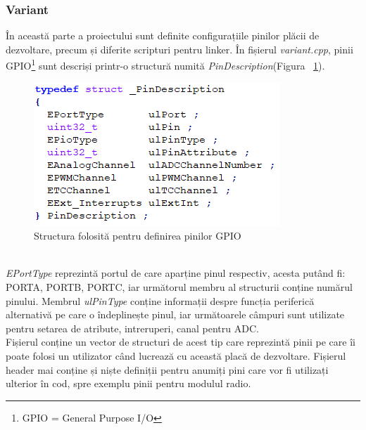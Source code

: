 \documentclass[12pt,a4paper]{report}
\begin{document}
\subsubsection{Variant}
În această parte a proiectului sunt definite configurațiile pinilor plăcii de dezvoltare, precum și diferite scripturi pentru linker.
 În fișierul \textit{variant.cpp}, pinii GPIO\footnote{GPIO = General Purpose I/O} sunt descriși printr-o structură numită \textit{PinDescription}(Figura ~\ref{fig:pindescription}).
\begin{figure}[h]
\centering
\includegraphics[scale=0.9]{pics/pindescription.png}
  \caption{Structura folosită pentru definirea pinilor GPIO}
  \label{fig:pindescription}
\end{figure}\\
\textit{EPortType} reprezintă portul de care aparține pinul respectiv, acesta putând fi: PORTA, PORTB, PORTC, iar următorul membru al structurii conține numărul pinului. Membrul \textit{ulPinType} conține informații despre funcția periferică alternativă pe care o îndeplinește pinul, iar următoarele câmpuri sunt utilizate pentru setarea de atribute, intreruperi, canal pentru ADC.\\
Fișierul conține un vector de structuri de acest tip care reprezintă pinii pe care îi poate folosi un utilizator când lucrează cu această placă de dezvoltare. Fișierul header mai conține și niște definiții pentru anumiți pini care vor fi utilizați ulterior în cod, spre exemplu pinii pentru modulul radio.
\end{document}
